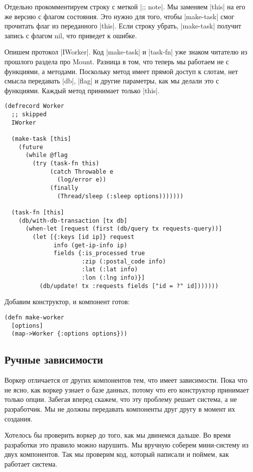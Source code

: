 Отдельно прокомментируем строку с меткой \spverb|;; note|. Мы заменяем \spverb|this| на его же
версию с флагом состояния. Это нужно для того, чтобы \spverb|make-task| смог прочитать
флаг из переданного \spverb|this|. Если строку убрать, \spverb|make-task| получит запись с
флагом nil, что приведет к ошибке.

Опишем протокол \spverb|IWorker|. Код \spverb|make-task| и \spverb|task-fn| уже знаком читателю из
прошлого раздела про Mount. Разница в том, что теперь мы работаем не с
функциями, а методами. Поскольку метод имеет прямой доступ к слотам, нет смысла
передавать \spverb|db|, \spverb|flag| и другие параметры, как мы делали это с
функциями. Каждый метод принимает только \spverb|this|.

\begin{verbatim}
(defrecord Worker
  ;; skipped
  IWorker

  (make-task [this]
    (future
      (while @flag
        (try (task-fn this)
             (catch Throwable e
               (log/error e))
             (finally
               (Thread/sleep (:sleep options)))))))

  (task-fn [this]
    (db/with-db-transaction [tx db]
      (when-let [request (first (db/query tx requests-query))]
        (let [{:keys [id ip]} request
              info (get-ip-info ip)
              fields {:is_processed true
                      :zip (:postal_code info)
                      :lat (:lat info)
                      :lon (:lng info)}]
          (db/update! tx :requests fields ["id = ?" id]))))))
\end{verbatim}

Добавим конструктор, и компонент готов:

\begin{verbatim}
(defn make-worker
  [options]
  (map->Worker {:options options}))
\end{verbatim}

\subsection{Ручные зависимости}

Воркер отличается от других компонентов тем, что имеет зависимости. Пока что не
ясно, как воркер узнает о базе данных, потому что его конструктор принимает
только опции. Забегая вперед скажем, что эту проблему решает система, а не
разработчик. Мы не должны передавать компоненты друг другу в момент их создания.

Хотелось бы проверить воркер до того, как мы двинемся дальше. Во время
разработки это правило можно нарушить. Мы вручную соберем мини-систему из двух
компонентов. Так мы проверим код, который написали и поймем, как работает
система.

